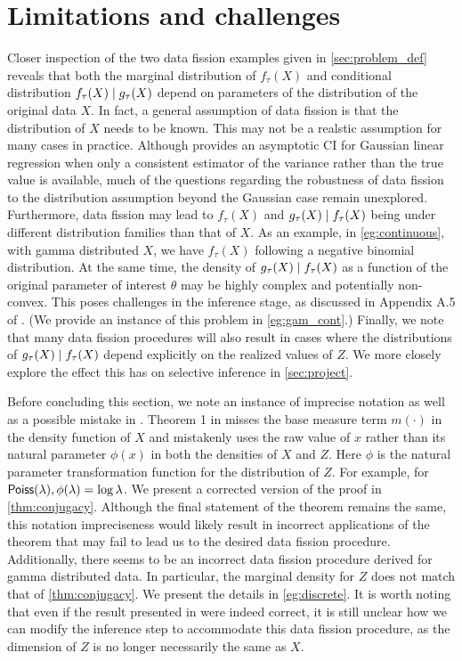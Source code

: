 \section{Limitations and challenges}
Closer inspection of the two data fission examples given in \cref{sec:problem_def} reveals that both the marginal distribution of $f_\tau(X)$ and conditional distribution $f_\tau(X) \mid g_\tau(X)$ depend on parameters of the distribution of the original data $X$. In fact, a general assumption of data fission is that the distribution of $X$ needs to be known. This may not be a realstic assumption for many cases in practice. Although \cite{leiner2022data} provides an asymptotic CI for Gaussian linear regression when only a consistent estimator of the variance rather than the true value is available, much of the questions regarding the robustness of data fission to the distribution assumption beyond the Gaussian case remain unexplored. Furthermore, data fission may lead to $f_\tau(X)$ and $g_\tau(X) \mid f_\tau(X)$ being under different distribution families than that of $X$. As an example, in \cref{eg:continuous}, with gamma distributed $X$, we have $f_\tau(X)$ following a negative binomial distribution. At the same time, the density of $g_\tau(X)\mid f_\tau(X)$ as a function of the original parameter of interest $\theta$ may be highly complex and potentially non-convex. This poses challenges in the inference stage, as discussed in Appendix A.5 of \cite{leiner2022data}. (We provide an instance of this problem in \cref{eg:gam_cont}.) Finally, we note that many data fission procedures will also result in cases where the distributions of $g_\tau(X)\mid f_\tau(X)$ depend explicitly on the realized values of $Z$. We more closely explore the effect this has on selective inference in \cref{sec:project}.

Before concluding this section, we note an instance of imprecise notation as well as a possible mistake in \cite{leiner2022data}. Theorem 1 in \cite{leiner2022data} misses the base measure term $m(\cdot)$ in the density function of $X$ and mistakenly uses the raw value of $x$ rather than its natural parameter $\phi(x)$ in both the densities of $X$ and $Z$. Here $\phi$ is the natural parameter transformation function for the distribution of $Z$. For example, for ${\sf{Poiss}}(\lambda), \phi(\lambda) = \log\lambda$. We present a corrected version of the proof in \cref{thm:conjugacy}. Although the final statement of the theorem remains the same, this notation impreciseness would likely result in incorrect applications of the theorem that may fail to lead us to the desired data fission procedure. Additionally, there seems to be an incorrect data fission procedure derived for gamma distributed data. In particular, the marginal density for $Z$ does not match that of \cref{thm:conjugacy}. We present the details in \cref{eg:discrete}. It is worth noting that even if the result presented in \cite{leiner2022data} were indeed correct, it is still unclear how we can modify the inference step to accommodate this data fission procedure, as the dimension of $Z$ is no longer necessarily the same as $X$.